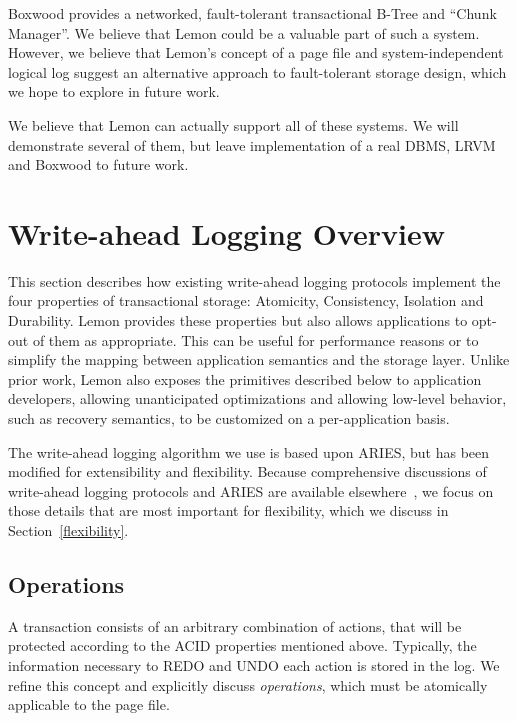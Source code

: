 \documentclass[10pt,letterpaper,twocolumn,english]{article}
\newcommand{\yad}{Lemon\xspace}
\newcommand{\eab}[1]{\textcolor{red}{\bf EAB: #1}}
\newcommand{\rcs}[1]{\textcolor{green}{\bf RCS: #1}}
\begin{document}

Boxwood provides a networked, fault-tolerant transactional B-Tree and
``Chunk Manager''.  We believe that \yad could be a valuable part of
such a system.  However, we believe that \yad's concept of a page file
and system-independent logical log suggest an alternative approach to
fault-tolerant storage design, which we hope to explore in future
work.

We believe that \yad can actually support all of these systems. We will
demonstrate several of them, but leave implementation of a real DBMS,
LRVM and Boxwood to future work.





\section{Write-ahead Logging Overview}

This section describes how existing write-ahead logging protocols
implement the four properties of transactional storage: Atomicity,
Consistency, Isolation and Durability.  \yad provides these
properties but also allows applications to opt-out of
them as appropriate.  This can be useful for
performance reasons or to simplify the mapping between application
semantics and the storage layer.  Unlike prior work, \yad also exposes
the primitives described below to application developers, allowing
unanticipated optimizations and allowing low-level
behavior, such as recovery semantics, to be customized on a
per-application basis.

The write-ahead logging algorithm we use is based upon ARIES, but has been
modified for extensibility and flexibility. Because comprehensive
discussions of write-ahead logging protocols and ARIES are available
elsewhere~\cite{haerder, aries}, we focus on those details that are
most important for flexibility, which we discuss in Section~\ref{flexibility}.


\subsection{Operations}
\label{sub:OperationProperties}

A transaction consists of an arbitrary combination of actions, that
will be protected according to the ACID properties mentioned above.
Typically, the
information necessary to REDO and UNDO each action is stored in the
log.  We refine this concept and explicitly discuss {\em operations},
which must be atomically applicable to the page file.  
\end{document}

